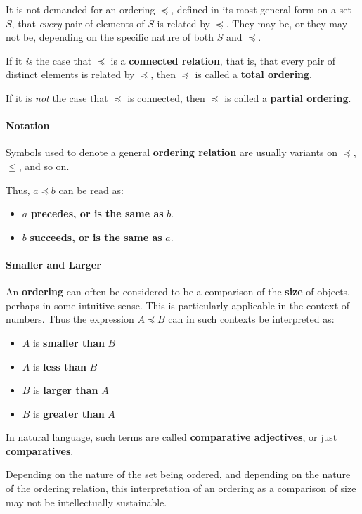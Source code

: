 It is not demanded for an ordering $\preceq$, defined in its most
general form on a set $S$, that \textit{every} pair of elements of $S$
is related by $\preceq$. They may be, or they may not be, depending on
the specific nature of both $S$ and $\preceq$.

If it \textit{is} the case that $\preceq$ is a \textbf{connected
  relation}, that is, that every pair of distinct elements is related
by $\preceq$, then $\preceq$ is called a \textbf{total ordering}.

If it is \textit{not} the case that $\preceq$ is connected, then
$\preceq$ is called a \textbf{partial ordering}.


\paragraph{Notation}

Symbols used to denote a general \textbf{ordering relation} are
usually variants on $\preceq$, $\leq$, and so on.

Thus, $a \preceq b$ can be read as:
\begin{itemize}
\item $a$ \textbf{precedes, or is the same as} $b$.
\item $b$ \textbf{succeeds, or is the same as} $a$.
\end{itemize}

\paragraph{Smaller and Larger}

An \textbf{ordering} can often be considered to be a comparison of the
\textbf{size} of objects, perhaps in some intuitive sense. This is
particularly applicable in the context of numbers. Thus the expression
$A \preceq B$ can in such contexts be interpreted as:
\begin{itemize}
\item $A$ is \textbf{smaller than} $B$
\item $A$ is \textbf{less than} $B$
\item $B$ is \textbf{larger than} $A$
\item $B$ is \textbf{greater than} $A$
\end{itemize}

In natural language, such terms are called \textbf{comparative
  adjectives}, or just \textbf{comparatives}.

Depending on the nature of the set being ordered, and depending on the
nature of the ordering relation, this interpretation of an ordering as
a comparison of size may not be intellectually sustainable.


